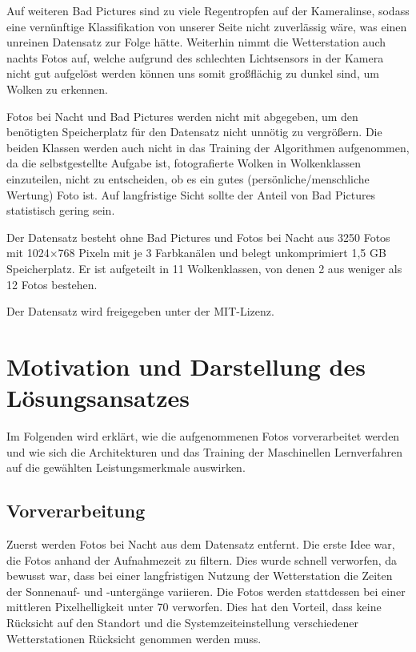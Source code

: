 Auf weiteren Bad Pictures sind zu
viele Regentropfen auf der Kameralinse, sodass eine vernünftige
Klassifikation von unserer Seite nicht zuverlässig wäre,
was einen unreinen Datensatz zur Folge hätte.
Weiterhin nimmt die Wetterstation auch nachts Fotos auf, welche aufgrund
des schlechten Lichtsensors in der Kamera nicht gut aufgelöst werden
können uns somit großflächig zu dunkel sind, um Wolken zu erkennen.

Fotos bei Nacht und Bad Pictures werden nicht mit abgegeben, um den
benötigten Speicherplatz für den Datensatz nicht unnötig zu vergrößern.
Die beiden Klassen werden auch nicht in das Training der Algorithmen
aufgenommen, da die selbstgestellte Aufgabe ist, fotografierte Wolken in
Wolkenklassen einzuteilen, nicht zu entscheiden, ob es ein gutes
(persönliche/menschliche Wertung) Foto ist. Auf langfristige Sicht
sollte der Anteil von Bad Pictures statistisch gering sein.

Der Datensatz besteht ohne Bad Pictures und Fotos bei Nacht aus 3250
Fotos mit 1024$\times$768 Pixeln mit je 3 Farbkanälen und belegt unkomprimiert
1,5 GB Speicherplatz. Er ist aufgeteilt in 11 Wolkenklassen, von denen 2
aus weniger als 12 Fotos bestehen.

Der Datensatz wird freigegeben unter der MIT-Lizenz.

\hypertarget{motivation-und-darstellung-des-luxf6sungsansatzes}{%
\section{Motivation und Darstellung des
Lösungsansatzes}\label{motivation-und-darstellung-des-luxf6sungsansatzes}}

Im Folgenden wird erklärt, wie die aufgenommenen Fotos vorverarbeitet
werden und wie sich die Architekturen und das Training der Maschinellen
Lernverfahren auf die gewählten Leistungsmerkmale auswirken.

\hypertarget{vorverarbeitung}{%
\subsection{Vorverarbeitung}\label{vorverarbeitung}}

Zuerst werden Fotos bei Nacht aus dem Datensatz entfernt. Die erste Idee
war, die Fotos anhand der Aufnahmezeit zu filtern. Dies wurde schnell
verworfen, da bewusst war, dass bei einer langfristigen Nutzung der
Wetterstation die Zeiten der Sonnenauf- und -untergänge variieren. Die
Fotos werden stattdessen bei einer mittleren Pixelhelligkeit unter 70
verworfen. Dies hat den Vorteil, dass keine Rücksicht auf den Standort
und die Systemzeiteinstellung verschiedener Wetterstationen Rücksicht
genommen werden muss.

